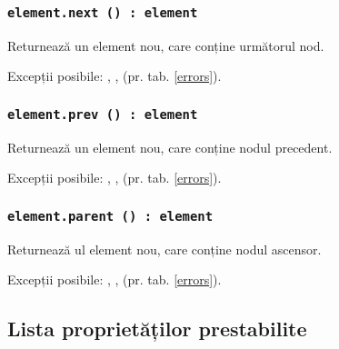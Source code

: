\subsubsection{\texttt{element.next () : element}}

Returnează un element nou, care conține următorul nod.

Excepții posibile: , ,  (pr. tab. \ref{errors}).

\subsubsection{\texttt{element.prev () : element}}

Returnează un element nou, care conține nodul precedent.

Excepții posibile: , ,  (pr. tab. \ref{errors}).

\subsubsection{\texttt{element.parent () : element}}

Returnează ul element nou, care conține nodul ascensor.

Excepții posibile: , ,  (pr. tab. \ref{errors}).

\subsection{Lista proprietăților prestabilite}
\label{elements:predefined:properties}

